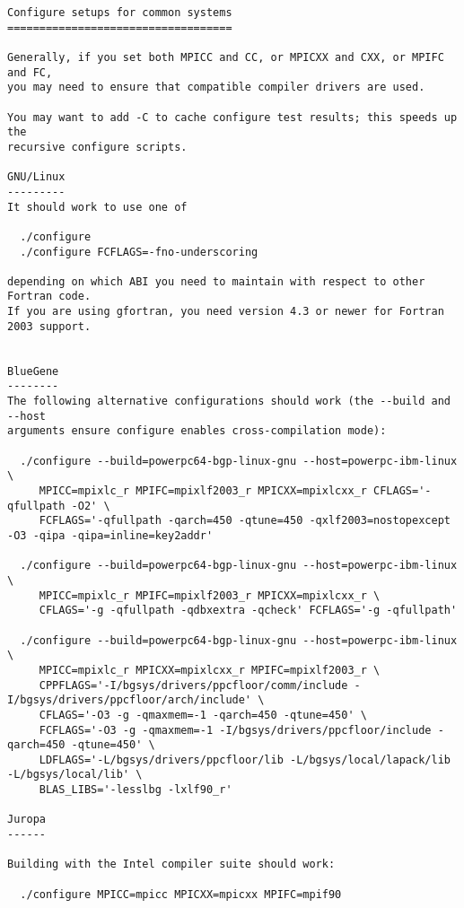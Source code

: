 \begin{verbatim}
Configure setups for common systems
===================================

Generally, if you set both MPICC and CC, or MPICXX and CXX, or MPIFC and FC,
you may need to ensure that compatible compiler drivers are used.

You may want to add -C to cache configure test results; this speeds up the
recursive configure scripts.

GNU/Linux
---------
It should work to use one of

  ./configure
  ./configure FCFLAGS=-fno-underscoring

depending on which ABI you need to maintain with respect to other Fortran code.
If you are using gfortran, you need version 4.3 or newer for Fortran 2003 support.


BlueGene
--------
The following alternative configurations should work (the --build and --host
arguments ensure configure enables cross-compilation mode):

  ./configure --build=powerpc64-bgp-linux-gnu --host=powerpc-ibm-linux \
     MPICC=mpixlc_r MPIFC=mpixlf2003_r MPICXX=mpixlcxx_r CFLAGS='-qfullpath -O2' \
     FCFLAGS='-qfullpath -qarch=450 -qtune=450 -qxlf2003=nostopexcept -O3 -qipa -qipa=inline=key2addr'

  ./configure --build=powerpc64-bgp-linux-gnu --host=powerpc-ibm-linux \
     MPICC=mpixlc_r MPIFC=mpixlf2003_r MPICXX=mpixlcxx_r \
     CFLAGS='-g -qfullpath -qdbxextra -qcheck' FCFLAGS='-g -qfullpath'

  ./configure --build=powerpc64-bgp-linux-gnu --host=powerpc-ibm-linux \
     MPICC=mpixlc_r MPICXX=mpixlcxx_r MPIFC=mpixlf2003_r \
     CPPFLAGS='-I/bgsys/drivers/ppcfloor/comm/include -I/bgsys/drivers/ppcfloor/arch/include' \
     CFLAGS='-O3 -g -qmaxmem=-1 -qarch=450 -qtune=450' \
     FCFLAGS='-O3 -g -qmaxmem=-1 -I/bgsys/drivers/ppcfloor/include -qarch=450 -qtune=450' \
     LDFLAGS='-L/bgsys/drivers/ppcfloor/lib -L/bgsys/local/lapack/lib -L/bgsys/local/lib' \
     BLAS_LIBS='-lesslbg -lxlf90_r'

Juropa
------

Building with the Intel compiler suite should work:

  ./configure MPICC=mpicc MPICXX=mpicxx MPIFC=mpif90
\end{verbatim}
